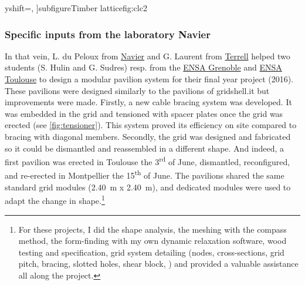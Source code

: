 {{			yshift=\PhotoRefSkip,
			]{subfigure}{}{Timber lattice}{fig:clc2}
	}
}


\subsubsection{Specific inputs from the laboratory Navier}
In that vein, L. du Peloux from \href{http://navier.enpc.fr}{Navier} and G. Laurent from \href{http://terrellgroup.net/index.php}{Terrell} helped two students (S. Hulin and G. Sudres) resp. from the \href{http://www.grenoble.archi.fr/en/school/educational-innovation.php}{ENSA Grenoble} and \href{http://www.toulouse.archi.fr/fr/index.html}{ENSA Toulouse} to design a modular pavilion system for their final year project (2016). These pavilions were designed similarly to the pavilions of gridshell.it but improvements were made. Firstly, a new cable bracing system was developed. It was embedded in the grid and tensioned with spacer plates once the grid was erected (see \cref{fig:tensioner}). This system proved its efficiency on site compared to bracing with diagonal members. Secondly, the grid was designed and fabricated so it could be dismantled and reassembled in a different shape. And indeed, a first pavilion was erected in Toulouse the 3\textsuperscript{rd} of June, dismantled, reconfigured, and re-erected in Montpellier the 15\textsuperscript{th} of June. The pavilions shared the same standard grid modules (\SI{2.40}{m} x \SI{2.40}{m}), and dedicated modules were used to adapt the change in shape.\footnote{For these projects, I did the shape analysis, the meshing with the compass method, the form-finding with my own dynamic relaxation software, wood testing and specification, grid system detailing (nodes, cross-sections, grid pitch, bracing, slotted holes, shear block, \telp{}) and provided a valuable assistance all along the project.}

